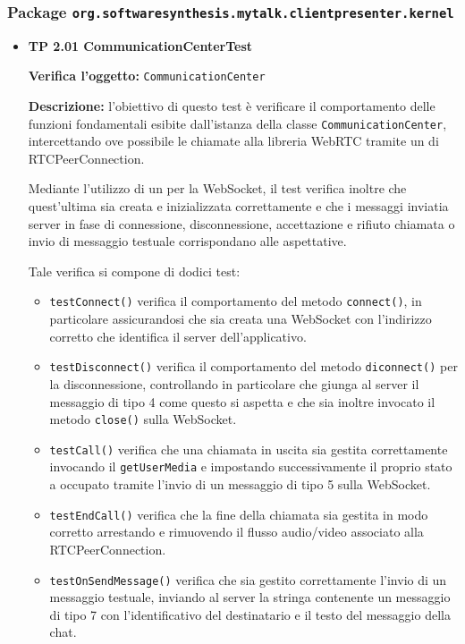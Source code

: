 \subsubsection{Package \texttt{org.softwaresynthesis.mytalk.clientpresenter.kernel}}
\begin{itemize}

\item[\passed] \textbf{TP 2.01 CommunicationCenterTest}

\textbf{Verifica l'oggetto:} \texttt{CommunicationCenter}

\textbf{Descrizione:} l'obiettivo di questo test è verificare il comportamento delle funzioni fondamentali esibite dall'istanza della classe \texttt{CommunicationCenter}, intercettando ove possibile le chiamate alla libreria WebRTC tramite un  di RTCPeerConnection.

Mediante l'utilizzo di un  per la WebSocket, il test verifica inoltre che quest'ultima sia creata e inizializzata correttamente e che i messaggi inviatia server in fase di connessione, disconnessione, accettazione e rifiuto chiamata o invio di messaggio testuale corrispondano alle aspettative.

Tale verifica si compone di dodici test:
\begin{itemize}
\item \texttt{testConnect()} verifica il comportamento del metodo \verb'connect()', in particolare assicurandosi che sia creata una WebSocket con l'indirizzo corretto che identifica il server dell'applicativo.

\item \texttt{testDisconnect()} verifica il comportamento del metodo \verb'diconnect()' per la disconnessione, controllando in particolare che giunga al server il messaggio di tipo 4 come questo si aspetta e che sia inoltre invocato il metodo \verb'close()' sulla WebSocket.

\item \texttt{testCall()} verifica che una chiamata in uscita sia gestita correttamente invocando il \verb'getUserMedia' e impostando successivamente il proprio stato a occupato tramite l'invio di un messaggio di tipo 5 sulla WebSocket.

\item \texttt{testEndCall()} verifica che la fine della chiamata sia gestita in modo corretto arrestando e rimuovendo il flusso audio/video associato alla RTCPeerConnection.

\item \texttt{testOnSendMessage()} verifica che sia gestito correttamente l'invio di un messaggio testuale, inviando al server la stringa contenente un messaggio di tipo 7 con l'identificativo del destinatario e il testo del messaggio della chat.


\end{itemize}
\end{itemize}

